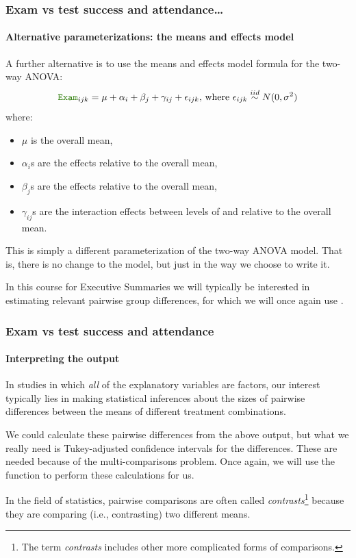 \documentclass{beamer}\usepackage[]{graphicx}\usepackage[]{xcolor}
\begin{document}
\begin{frame}[fragile]
\frametitle{Exam vs test success and attendance\ldots}
\framesubtitle{Alternative parameterizations: the means and effects model}

A further alternative is to use the means and effects model formula for the two-way ANOVA:
\[
\rcode{Exam}_{ijk} = \mu + \alpha_{i} + \beta_{j} + \gamma_{ij} + \epsilon_{ijk} \mbox{, where } \epsilon_{ijk} \iid N(0, \sigma^2)
\]
where: 
\begin{itemize}
  \item $\mu$ is the overall mean,
  \item $\alpha_i$s are the  effects relative to the overall mean,
  \item $\beta_j$s are the  effects relative to the overall mean,
  \item $\gamma_{ij}$s are the interaction effects between levels of  and  relative to the overall mean.
\end{itemize}

This is simply a different parameterization of the two-way ANOVA model. That is, there is no change to the model, but just in the way we choose to write it. 
\bigskip

In this course for Executive Summaries we will typically be interested in estimating relevant pairwise group differences, for which we will once again use .

\end{frame}







\begin{frame}[fragile]
\frametitle{Exam vs test success and attendance}
\framesubtitle{Interpreting the output}

In studies in which {\em all} of the explanatory variables are factors, our interest typically lies in making statistical inferences about the sizes of pairwise differences between the means of different treatment combinations. 
\medskip

We could calculate these pairwise differences from the above output, but what we really need is Tukey-adjusted confidence intervals for the differences. These are needed because of the multi-comparisons problem. Once again, we will use the  function to perform these calculations for us.

\bigskip

In the field of statistics, pairwise comparisons are often called {\em contrasts}\footnote{ The term {\em contrasts} includes other more complicated forms of comparisons.} because they are comparing (i.e., contrasting) two different means. 

\end{frame}
\end{document}
